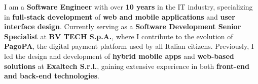 

\begin{cvparagraph}

I am a \textbf{Software Engineer} with over \textbf{10 years} in the IT industry, specializing in \textbf{full-stack development} of \textbf{web and mobile applications} and \textbf{user interface design}. Currently serving as a \textbf{Software Development Senior Specialist} at \textbf{BV TECH S.p.A.}, where I contribute to the evolution of \textbf{PagoPA}, the digital payment platform used by all Italian citizens. 
Previously, I led the design and development of \textbf{hybrid mobile apps} and \textbf{web-based solutions} at \textbf{Exaltech S.r.l.}, gaining extensive experience in both \textbf{front-end and back-end technologies}.

\end{cvparagraph}
